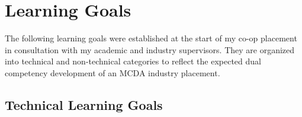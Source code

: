 ﻿%

\chapter{Learning Goals}
\label{chap:learning_goals}

The following learning goals were established at the start of my co-op placement
in consultation with my academic and industry supervisors. They are organized
into technical and non-technical categories to reflect the expected dual competency
development of an MCDA industry placement.


\FloatBarrier

\section{Technical Learning Goals}


